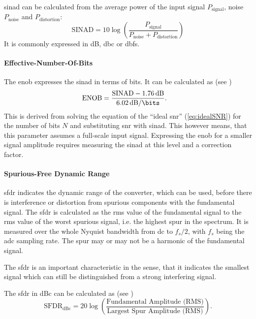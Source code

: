 \gls{sinad} can be calculated from the average power of the input signal $P_\text{signal}$, noise $P_\text{noise}$ and $P_\text{distortion}$:
\begin{equation}
	\text{SINAD} = 10 \log \left( \frac{P_\text{signal}}{P_\text{noise} + P_\text{distortion}} \right)
\end{equation}
It is commonly expressed in dB, \gls{dbc} or \gls{dbfs}.

\paragraph{Effective-Number-Of-Bits}
The \gls{enob} expresses the \gls{sinad} in terms of bits. It can be calculated as (see \cite{walt2009})
\begin{equation}
	\text{ENOB} = \frac{\text{SINAD}-\SI{1.76}{\decibel}}{\SI{6.02}{\decibel \per \bits}}. \quad 
\end{equation}
This is derived from solving the equation of the ``ideal \gls{snr}'' (\autoref{eq:idealSNR}) for the number of bits $N$ and substituting \gls{snr} with \gls{sinad}.
This however means, that this parameter assumes a full-scale input signal. Expressing the \gls{enob} for a smaller signal amplitude requires measuring the \gls{sinad} at this level and a correction factor. \cite{walt}

\paragraph{Spurious-Free Dynamic Range}
\gls{sfdr} indicates the dynamic range of the converter, which can be used, before there is interference or distortion from spurious components with the fundamental signal. \cite{Lundberg} 
The \gls{sfdr} is calculated as the \gls{rms} value of the fundamental signal to the \gls{rms} value of the worst spurious signal, i.e. the highest spur in the spectrum.
It is measured over the whole Nyquist bandwidth from \gls{dc} to $f_s/2$, with $f_s$ being the \gls{adc} sampling rate. The spur may or may not be a harmonic of the fundamental signal. \cite{walt2009, Lundberg}

The \gls{sfdr} is an important characteristic in the sense, that it indicates the smallest signal which can still be distinguished from a strong interfering signal. \cite{walt2009} 

The \gls{sfdr} in dBc can be calculated as (see \cite{xilinx_adc})%
\begin{equation}
	\text{SFDR}_\text{dBc} = 20 \log \left( \frac{\text{Fundamental Amplitude (RMS)}}{\text{Largest Spur Amplitude (RMS)}} \right).
\end{equation}


